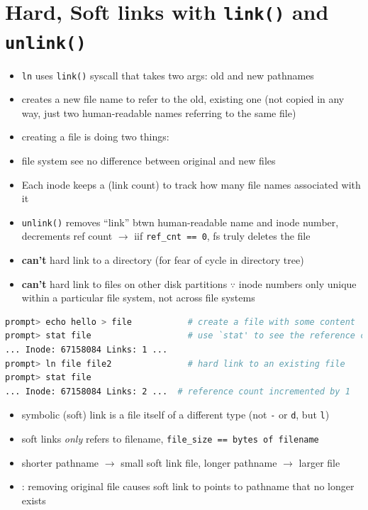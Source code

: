 \section*{Hard, Soft links with \texttt{link()} and \texttt{unlink()}}
\begin{itemize}
\item \texttt{ln} uses \texttt{link()} syscall that takes two args: old and new pathnames
\item {} creates a new file name to refer to the old, existing one (not copied in any way, just two human-readable names referring to the same file)
\item creating a file is doing two things:
\item file system see no difference between original and new files
\item Each inode keeps a  (link count) to track how many file names associated with it
\item \texttt{unlink()} removes ``link'' btwn human-readable name and inode number, decrements ref count $\to$ iif \texttt{ref\_cnt == 0}, fs truly deletes the file
\item \textbf{can't} hard link to a directory (for fear of cycle in directory tree)
\item \textbf{can't} hard link to files on other disk partitions $\because$ inode numbers only unique within a particular file system, not across file systems
\end{itemize}
\begin{lstlisting}[language=bash]
prompt> echo hello > file           # create a file with some content
prompt> stat file                   # use `stat' to see the reference count
... Inode: 67158084 Links: 1 ...
prompt> ln file file2               # hard link to an existing file
prompt> stat file
... Inode: 67158084 Links: 2 ...  # reference count incremented by 1
\end{lstlisting}
\begin{itemize}
\item symbolic (soft) link is a file itself of a different type (not \texttt{-} or \texttt{d}, but \texttt{l})
\item soft links \emph{only} refers to filename, \texttt{file\_size == bytes of filename}
\item shorter pathname $\to$ small soft link file, longer pathname $\to$ larger file
\item {}: removing original file causes soft link to points to pathname that no longer exists
\end{itemize}
